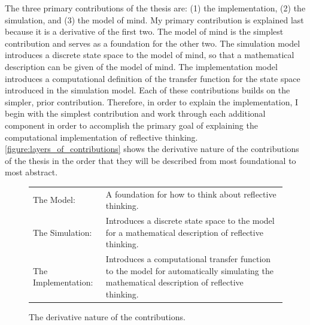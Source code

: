 The three primary contributions of the thesis are: (1) the
implementation, (2) the simulation, and (3) the model of mind.  My
primary contribution is explained last because it is a derivative of
the first two.  The model of mind is the simplest contribution and
serves as a foundation for the other two.  The simulation model
introduces a discrete state space to the model of mind, so that a
mathematical description can be given of the model of mind.  The
implementation model introduces a computational definition of the
transfer function for the state space introduced in the simulation
model.  Each of these contributions builds on the simpler, prior
contribution.  Therefore, in order to explain the implementation, I
begin with the simplest contribution and work through each additional
component in order to accomplish the primary goal of explaining the
computational implementation of reflective thinking.
{\mbox{\autoref{figure:layers_of_contributions}}} shows the derivative
nature of the contributions of the thesis in the order that they will
be described from most foundational to most abstract.
\begin{figure}
\center
\begin{tabular}{p{3.5cm}p{6.5cm}}
The Model:          & A foundation for how to think about reflective thinking. \\
The Simulation:     & Introduces a discrete state space to the model for a mathematical description of reflective thinking. \\
The Implementation: & Introduces a computational transfer function to the model for automatically simulating the mathematical description of reflective thinking.
\end{tabular}
\caption{The derivative nature of the contributions.}
\label{figure:layers_of_contributions}
\end{figure}


